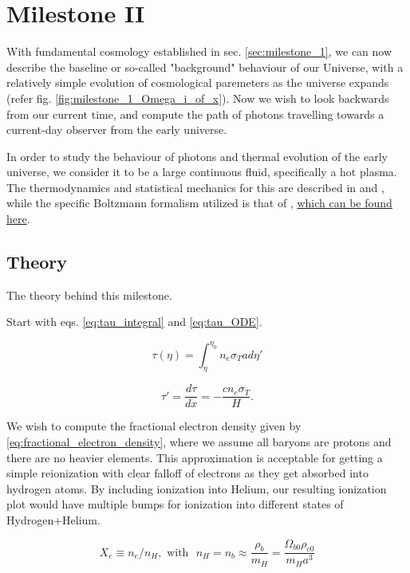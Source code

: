 \section{Milestone II}\label{sec:milestone_2}
With fundamental cosmology established in sec. \ref{sec:milestone_1}, we can now describe the baseline or so-called "background" behaviour of our Universe, with a relatively simple evolution of cosmological paremeters as the universe expands (refer fig. \ref{fig:milestone_1_Omega_i_of_x}). Now we wish to look backwards from our current time, and compute the path of photons travelling towards a current-day observer from the early universe.

In order to study the behaviour of photons and thermal evolution of the early universe, we consider it to be a large continuous fluid, specifically a hot plasma. The thermodynamics and statistical mechanics for this are described in \citet[][chap.~x]{baumannLectureNotesCosmology2017} and \citet[][chap.~x]{dodelsonModernCosmology2003}, while the specific Boltzmann formalism utilized is that of \citet[][]{wintherCosmologyIILecture2024}, \href{https://cmb.wintherscoming.no/theory_thermodynamics.php#thermo}{which can be found here}.

\subsection{Theory}
The theory behind this milestone.

Start with eqs. \ref{eq:tau_integral} and \ref{eq:tau_ODE}.

\begin{equation}\label{eq:tau_integral}
\tau(\eta) = \int_{\eta}^{\eta_0} n_e \sigma_T a d\eta'
\end{equation}

\begin{equation}\label{eq:tau_ODE}
\boxed{\tau' = \frac{d\tau}{dx} = -\frac{c n_e \sigma_T }{H}.}
\end{equation}

We wish to compute the fractional electron density given by \ref{eq:fractional_electron_density}, where we assume all baryons are protons and there are no heavier elements. This approximation is acceptable for getting a simple reionization with clear falloff of electrons as they get absorbed into hydrogen atoms. By including ionization into Helium, our resulting ionization plot would have multiple bumps for ionization into different states of Hydrogen+Helium.


\begin{equation}\label{eq:fractional_electron_density}
\boxed{X_e \equiv n_e / n_H}, \text{ with } \,\, n_H = n_b \approx \frac{\rho_b}{m_H} = \frac{\Omega_{b0} \rho_{c0}}{m_H a^3}
\end{equation}


